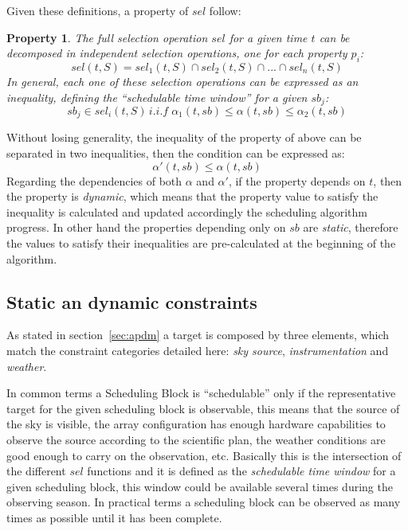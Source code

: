 Given these definitions, a property of $sel$ follow:

\newtheorem{sel-props}{Property}
\begin{sel-props}
The full selection operation $sel$ for a given time $t$ can be decomposed in independent selection operations, one for each property $p_i$:
$$sel(t,S) = sel_1(t, S) \cap sel_2(t, S) \cap ... \cap sel_n(t,S)$$
In general, each one of these selection operations can be expressed  as an inequality, defining the ``schedulable time window'' for a given $sb_j$:
$$sb_j \in sel_i(t, S)\,i.i.f\;\alpha_1(t, sb) \leq \alpha(t, sb) \leq \alpha_2(t, sb)$$
\end{sel-props}

Without losing generality, the inequality of the property of above can be separated in two inequalities, then the condition can be expressed as: 
$$\alpha'(t, sb) \leq \alpha (t, sb)$$
Regarding the dependencies of both $\alpha$ and $\alpha'$, if the property depends on $t$, then the property is \textit{dynamic}, which means that the property value to satisfy the inequality is calculated and updated accordingly the scheduling algorithm progress. In other hand the properties depending only on $sb$ are \textit{static}, therefore the values to satisfy their inequalities are pre-calculated at the beginning of the algorithm.\\

\subsection{Static an dynamic constraints}

As stated in section~\ref{sec:apdm} a target is composed by three elements, which match the constraint categories detailed here: \textit{sky source}, \textit{instrumentation} and \textit{weather}.

In common terms a Scheduling Block is ``schedulable'' only if the representative target for the given scheduling block is observable, this means that the source of the sky is visible, the array configuration has enough hardware capabilities to observe the source according to the scientific plan, the weather conditions are good enough to carry on the observation, etc. Basically this is the intersection of the different $sel$ functions and it is defined as the \textit{schedulable time window} for a given scheduling block, this window could be available several times during the observing season. In practical terms a scheduling block can be observed as many times as possible until it has been complete.

